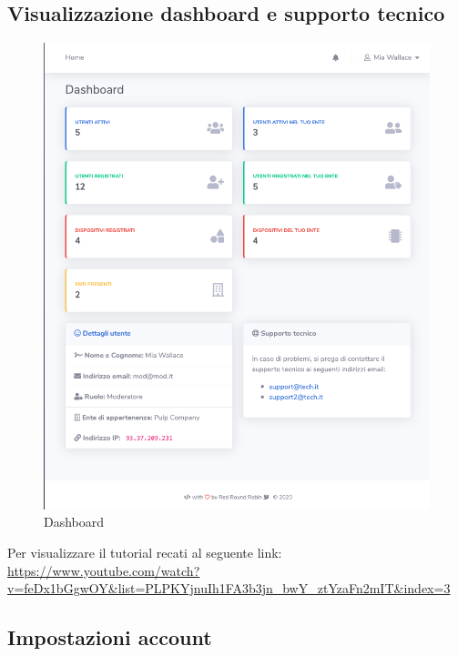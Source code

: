 \subsection{Visualizzazione dashboard e supporto tecnico}
	
	\begin{figure}[H]
		\centering
		\includegraphics[scale=0.600]{res/images/membro/dashboard.png}
		\caption{Dashboard}
	\end{figure}

	Per visualizzare il tutorial recati al seguente link: 
	\url{https://www.youtube.com/watch?v=feDx1bGgwOY&list=PLPKYjnuIh1FA3b3jn_bwY_ztYzaFn2mIT&index=3}

\subsection{Impostazioni account}

